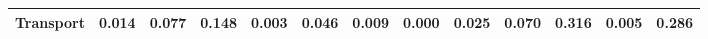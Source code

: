 \begin{table}[htbp]
\begin{tabular}{lcccccccccccc}
  Transport & \textcolor[RGB]{182,118,73}{0.014} & \textcolor[RGB]{78,50,177}{0.077} & \textcolor[RGB]{27,17,228}{0.148} & \textcolor[RGB]{232,150,23}{0.003} & \textcolor[RGB]{113,73,142}{0.046} & \textcolor[RGB]{195,126,60}{0.009} & \textcolor[RGB]{251,163,4}{0.000} & \textcolor[RGB]{158,102,97}{0.025} & \textcolor[RGB]{90,58,165}{0.070} & \textcolor[RGB]{19,13,236}{0.316} & \textcolor[RGB]{218,141,37}{0.005} & \textcolor[RGB]{21,14,234}{0.286} \\ 
   \hline
\end{tabular}
\end{table}
